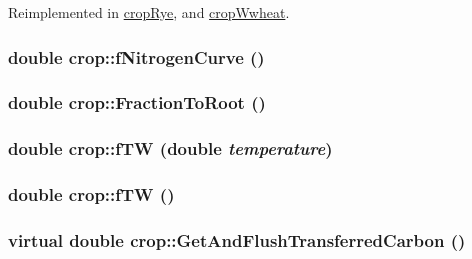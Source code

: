 Reimplemented in \hyperlink{classcrop_rye_a2781d1b924cb3e3f9fba021a5052c629}{cropRye}, and \hyperlink{classcrop_wwheat_aa4c7b3fd03506c8d3ca174bfc31d93e2}{cropWwheat}.\hypertarget{classcrop_a3bcfac5c51663141e42b2d6bd17a2cb6}{
\subsubsection[{fNitrogenCurve}]{\setlength{\rightskip}{0pt plus 5cm}double crop::fNitrogenCurve ()}}
\label{classcrop_a3bcfac5c51663141e42b2d6bd17a2cb6}
\hypertarget{classcrop_a210e5515e11a5b705e0d3cd99a12e581}{
\subsubsection[{FractionToRoot}]{\setlength{\rightskip}{0pt plus 5cm}double crop::FractionToRoot ()}}
\label{classcrop_a210e5515e11a5b705e0d3cd99a12e581}
\hypertarget{classcrop_a4697bfc911fdbf7ffb8c8bc5af5eaaeb}{
\subsubsection[{fTW}]{\setlength{\rightskip}{0pt plus 5cm}double crop::fTW (double {\em temperature})}}
\label{classcrop_a4697bfc911fdbf7ffb8c8bc5af5eaaeb}
\hypertarget{classcrop_a9ff0b086b54afd4c235cb80a9a080d05}{
\subsubsection[{fTW}]{\setlength{\rightskip}{0pt plus 5cm}double crop::fTW ()}}
\label{classcrop_a9ff0b086b54afd4c235cb80a9a080d05}
\hypertarget{classcrop_a1eb45dfdaae692240eac0102df381742}{
\subsubsection[{GetAndFlushTransferredCarbon}]{\setlength{\rightskip}{0pt plus 5cm}virtual double crop::GetAndFlushTransferredCarbon ()}}
